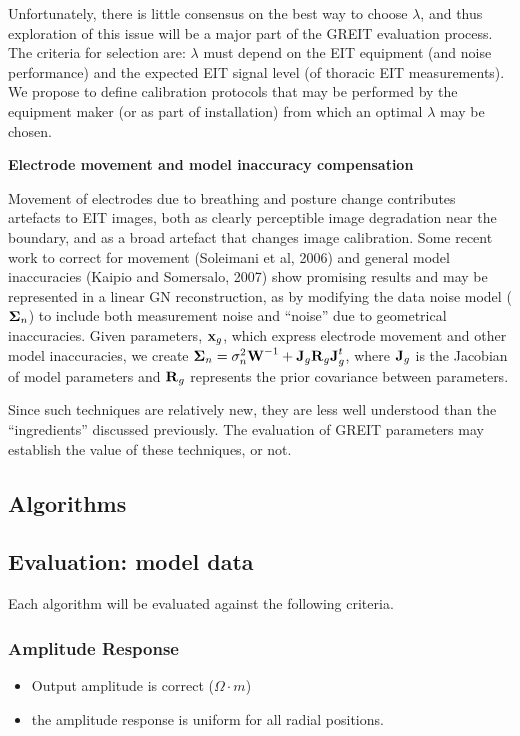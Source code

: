 \documentclass[letterpaper,twocolumn,11pt]{article}
\newcommand{\xB}{\mbox{$\bf x$}}
\newcommand{\JB}{\mbox{$\bf J$}}
\newcommand{\RB}{\mbox{$\bf R$}}
\newcommand{\WB}{\mbox{$\bf W$}}
\newcommand{\SG}{\mbox{$\bf \Sigma$}}
\begin{document}
\begin{list}{\bf {}.}
Unfortunately, there is little consensus on the best
way to choose $\lambda$, and thus exploration of 
this issue will be a major part of the GREIT evaluation
process. The criteria for selection are:
$\lambda$ must depend on the EIT equipment (and noise
performance) and the expected EIT signal level (of
thoracic EIT measurements). We propose to define
calibration protocols that may be performed by the 
equipment maker (or as part of installation) from which
an optimal $\lambda$ may be chosen.

\item {\bf Electrode movement and model inaccuracy compensation}

Movement of electrodes due to breathing and posture change
contributes artefacts to EIT images, both as clearly perceptible
image degradation near the boundary, and as a broad artefact
that changes image calibration. 
Some recent work to correct for movement (Soleimani et al, 2006)
and general model inaccuracies (Kaipio and Somersalo, 2007)
show promising results and may be represented in a linear
GN reconstruction, as by modifying the data noise model
($\SG_n$) to include both measurement noise and ``noise'' 
due to geometrical inaccuracies. Given parameters, $\xB_g$,
which express electrode movement and other model inaccuracies,
we create $\SG_n = \sigma_n^2 \WB^{-1} + \JB_g \RB_g \JB_g^t$,
where $\JB_g$ is the Jacobian of model parameters and $\RB_g$
represents the prior covariance between parameters.

Since such techniques are relatively new, they are less well
understood than the ``ingredients'' discussed previously. 
The evaluation of GREIT parameters may establish the value
of these techniques, or not.




\end{list}


\subsection{Algorithms}
\subsection{Evaluation: model data}

Each algorithm will be evaluated against the
following criteria.

\subsubsection{Amplitude Response}
   \begin{itemize}
   \item Output amplitude is correct ($\Omega \cdot m$)
   \item the amplitude response is uniform for all radial positions.
   \end{itemize}
\end{document}
